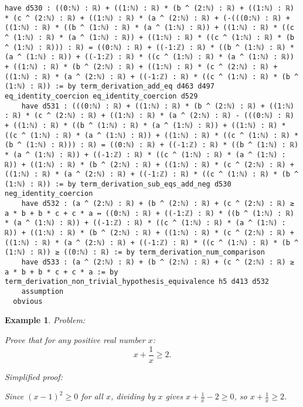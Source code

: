 \documentclass{article}
\newtheorem{example}{Example}
\begin{document}
\begin{tcolorbox}[colback=white!10, width=\linewidth]
\begin{lstlisting}[language=Lean4]
    have d530 : ((0:ℕ) : ℝ) + ((1:ℕ) : ℝ) * (b ^ (2:ℕ) : ℝ) + ((1:ℕ) : ℝ) * (c ^ (2:ℕ) : ℝ) + ((1:ℕ) : ℝ) * (a ^ (2:ℕ) : ℝ) + (-(((0:ℕ) : ℝ) + ((1:ℕ) : ℝ) * ((b ^ (1:ℕ) : ℝ) * (a ^ (1:ℕ) : ℝ)) + ((1:ℕ) : ℝ) * ((c ^ (1:ℕ) : ℝ) * (a ^ (1:ℕ) : ℝ)) + ((1:ℕ) : ℝ) * ((c ^ (1:ℕ) : ℝ) * (b ^ (1:ℕ) : ℝ))) : ℝ) = ((0:ℕ) : ℝ) + ((-1:ℤ) : ℝ) * ((b ^ (1:ℕ) : ℝ) * (a ^ (1:ℕ) : ℝ)) + ((-1:ℤ) : ℝ) * ((c ^ (1:ℕ) : ℝ) * (a ^ (1:ℕ) : ℝ)) + ((1:ℕ) : ℝ) * (b ^ (2:ℕ) : ℝ) + ((1:ℕ) : ℝ) * (c ^ (2:ℕ) : ℝ) + ((1:ℕ) : ℝ) * (a ^ (2:ℕ) : ℝ) + ((-1:ℤ) : ℝ) * ((c ^ (1:ℕ) : ℝ) * (b ^ (1:ℕ) : ℝ)) := by term_derivation_add_eq d463 d497 eq_identity_coercion eq_identity_coercion d529
    have d531 : (((0:ℕ) : ℝ) + ((1:ℕ) : ℝ) * (b ^ (2:ℕ) : ℝ) + ((1:ℕ) : ℝ) * (c ^ (2:ℕ) : ℝ) + ((1:ℕ) : ℝ) * (a ^ (2:ℕ) : ℝ) - (((0:ℕ) : ℝ) + ((1:ℕ) : ℝ) * ((b ^ (1:ℕ) : ℝ) * (a ^ (1:ℕ) : ℝ)) + ((1:ℕ) : ℝ) * ((c ^ (1:ℕ) : ℝ) * (a ^ (1:ℕ) : ℝ)) + ((1:ℕ) : ℝ) * ((c ^ (1:ℕ) : ℝ) * (b ^ (1:ℕ) : ℝ))) : ℝ) = ((0:ℕ) : ℝ) + ((-1:ℤ) : ℝ) * ((b ^ (1:ℕ) : ℝ) * (a ^ (1:ℕ) : ℝ)) + ((-1:ℤ) : ℝ) * ((c ^ (1:ℕ) : ℝ) * (a ^ (1:ℕ) : ℝ)) + ((1:ℕ) : ℝ) * (b ^ (2:ℕ) : ℝ) + ((1:ℕ) : ℝ) * (c ^ (2:ℕ) : ℝ) + ((1:ℕ) : ℝ) * (a ^ (2:ℕ) : ℝ) + ((-1:ℤ) : ℝ) * ((c ^ (1:ℕ) : ℝ) * (b ^ (1:ℕ) : ℝ)) := by term_derivation_sub_eqs_add_neg d530 neg_identity_coercion
    have d532 : (a ^ (2:ℕ) : ℝ) + (b ^ (2:ℕ) : ℝ) + (c ^ (2:ℕ) : ℝ) ≥ a * b + b * c + c * a ↔ ((0:ℕ) : ℝ) + ((-1:ℤ) : ℝ) * ((b ^ (1:ℕ) : ℝ) * (a ^ (1:ℕ) : ℝ)) + ((-1:ℤ) : ℝ) * ((c ^ (1:ℕ) : ℝ) * (a ^ (1:ℕ) : ℝ)) + ((1:ℕ) : ℝ) * (b ^ (2:ℕ) : ℝ) + ((1:ℕ) : ℝ) * (c ^ (2:ℕ) : ℝ) + ((1:ℕ) : ℝ) * (a ^ (2:ℕ) : ℝ) + ((-1:ℤ) : ℝ) * ((c ^ (1:ℕ) : ℝ) * (b ^ (1:ℕ) : ℝ)) ≥ ((0:ℕ) : ℝ) := by term_derivation_num_comparison
    have d533 : (a ^ (2:ℕ) : ℝ) + (b ^ (2:ℕ) : ℝ) + (c ^ (2:ℕ) : ℝ) ≥ a * b + b * c + c * a := by term_derivation_non_trivial_hypothesis_equivalence h5 d413 d532
    assumption
  obvious

\end{lstlisting}
\end{tcolorbox}


\begin{example}
Problem:
\begin{tcolorbox}[colback=yellow!10, width=\linewidth]
Prove that for any positive real number $x$:
    $$x + \frac{1}{x} \geq 2.$$
\end{tcolorbox}

Simplified proof:
\begin{tcolorbox}[colback=blue!10, width=\linewidth]
Since $(x-1)^2 \ge 0$ for all $x$, dividing by $x$ gives $x + \frac{1}{x} - 2 \ge 0$, so $x + \frac{1}{x} \ge 2$.
\end{tcolorbox}
\end{example}
\end{document}
